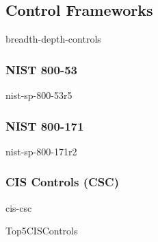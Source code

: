 \documentclass[12pt]{article}
\begin{document}
                 \subsection{Control Frameworks}
                                
                                {breadth-depth-controls}
                                
                                \subsubsection{NIST 800-53}
                                
                                               {nist-sp-800-53r5}
                                \subsubsection{NIST 800-171}
                                
                                               {nist-sp-800-171r2}
                                \subsubsection{CIS Controls (CSC)}       
                                        
                                        {cis-csc}
                                        
                                        {Top5CISControls}
                                        
                                        
\cleardoublepage
                                        
                                        
                                        
\end{document}
